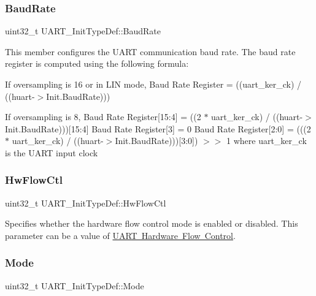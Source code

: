 \subsubsection{\texorpdfstring{BaudRate}{BaudRate}}
{\footnotesize\ttfamily uint32\+\_\+t U\+A\+R\+T\+\_\+\+Init\+Type\+Def\+::\+Baud\+Rate}

This member configures the U\+A\+RT communication baud rate. The baud rate register is computed using the following formula\+:
\begin{DoxyItemize}
\item If oversampling is 16 or in L\+IN mode, Baud Rate Register = ((uart\+\_\+ker\+\_\+ck) / ((huart-\/$>$Init.\+Baud\+Rate)))
\item If oversampling is 8, Baud Rate Register\mbox{[}15\+:4\mbox{]} = ((2 $\ast$ uart\+\_\+ker\+\_\+ck) / ((huart-\/$>$Init.\+Baud\+Rate)))\mbox{[}15\+:4\mbox{]} Baud Rate Register\mbox{[}3\mbox{]} = 0 Baud Rate Register\mbox{[}2\+:0\mbox{]} = (((2 $\ast$ uart\+\_\+ker\+\_\+ck) / ((huart-\/$>$Init.\+Baud\+Rate)))\mbox{[}3\+:0\mbox{]}) $>$$>$ 1 where uart\+\_\+ker\+\_\+ck is the U\+A\+RT input clock 
\end{DoxyItemize}\mbox{\label{struct_u_a_r_t___init_type_def_adbf4734130666b94201c6658464c1622}} 
\subsubsection{\texorpdfstring{HwFlowCtl}{HwFlowCtl}}
{\footnotesize\ttfamily uint32\+\_\+t U\+A\+R\+T\+\_\+\+Init\+Type\+Def\+::\+Hw\+Flow\+Ctl}

Specifies whether the hardware flow control mode is enabled or disabled. This parameter can be a value of \mbox{\hyperlink{group___u_a_r_t___hardware___flow___control}{U\+A\+RT Hardware Flow Control}}. \mbox{\label{struct_u_a_r_t___init_type_def_ab2ee6ea5a5d4ca5ee6b759be197bcfcb}} 
\subsubsection{\texorpdfstring{Mode}{Mode}}
{\footnotesize\ttfamily uint32\+\_\+t U\+A\+R\+T\+\_\+\+Init\+Type\+Def\+::\+Mode}

